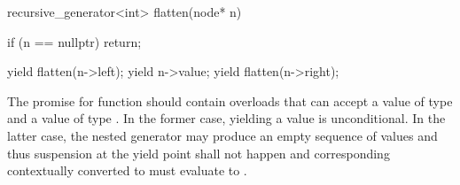\enterexample
\begin{codeblock}
  recursive_generator<int> flatten(node* n)
  {
    if (n == nullptr)
      return;
    
    yield flatten(n->left);
    yield n->value;
    yield flatten(n->right);
  }
\end{codeblock}

The promise for  function should contain overloads that can accept a value of type  and a value of type .
In the former case, yielding a value is unconditional. In the latter case, the nested generator may produce an empty sequence of values and thus suspension at the yield point shall not happen and corresponding  contextually converted to  must evaluate to . 
\exitexample